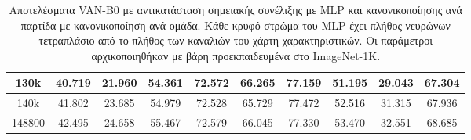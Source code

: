 \documentclass[12pt]{article}
\numberwithin{equation}{section}
\begin{document}
\begin{table}[htbp]
{\begin{tabular}{|c|c|c|c|c|c|c|c|c|c|}
130k   & 40.719 & 21.960 & 54.361 & 72.572 & 66.265 & 77.159 & 51.195 & 29.043 & 67.304 \\ \hline
140k   & 41.802 & 23.685 & 54.979 & 72.528 & 65.729 & 77.472 & 52.516 & 31.315 & 67.936 \\ \hline
148800 & 42.495 & 24.658 & 55.467 & 72.579 & 66.045 & 77.330 & 53.470 & 32.551 & 68.685 \\ \hline
\end{tabular}}
\caption{Αποτελέσματα VAN-B0 με αντικατάσταση σημειακής συνέλιξης με MLP και κανονικοποίησης ανά παρτίδα με κανονικοποίηση ανά ομάδα. Κάθε κρυφό στρώμα του MLP έχει πλήθος νευρώνων τετραπλάσιο από το πλήθος των καναλιών του χάρτη χαρακτηριστικών. Οι παράμετροι αρχικοποιηθήκαν με βάρη προεκπαιδευμένα στο ImageNet-1K.}
\label{tab:MLP51Group}
\end{table}
\end{document}
